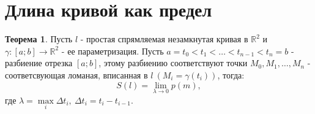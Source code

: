 \documentclass{report}
\theoremstyle{definition}
\newtheorem{theorem}{Теорема}[section]
\begin{document}
\section{Длина кривой как предел}

\begin{theorem}
  Пусть $l$ - простая спрямляемая незамкнутая кривая в $\mathbb{R}^2$ и $\gamma:[a;b]\rightarrow\mathbb{R}^2$
  - ее параметризация. Пусть $a = t_0 < t_1 < \ldots < t_{n-1} < t_n = b$ - разбиение отрезка $[a;b]$,
  этому разбиению соответствуют точки $M_0,M_1,\ldots,M_n$ - соответсвующая ломаная, вписанная в $l \
    (M_i = \gamma(t_i))$, тогда:
  \begin{equation*}
    S(l) = \underset{\lambda\rightarrow0}{\lim}p(m),
  \end{equation*}
  где $\lambda = \underset{i}{\max}\Delta t_i, \ \Delta t_i = t_i - t_{i-1}$.
\end{theorem}
\end{document}
